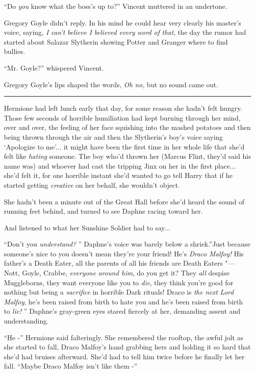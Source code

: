 ``Do \emph{you} know what the boss's up to?'' Vincent muttered in an
undertone.

Gregory Goyle didn't reply. In his mind he could hear very clearly his
master's voice, saying, \emph{I can't believe I believed every word of
that}, the day the rumor had started about Salazar Slytherin showing
Potter and Granger where to find bullies.

``Mr. Goyle?'' whispered Vincent.

Gregory Goyle's lips shaped the words, \emph{Oh no,} but no sound came
out.

\begin{center}\rule{3in}{0.4pt}\end{center}

Hermione had left lunch early that day, for some reason she hadn't felt
hungry. Those few seconds of horrible humiliation had kept burning
through her mind, over and over, the feeling of her face squishing into
the mashed potatoes and then being thrown through the air and then the
Slytherin's boy's voice saying `Apologize to me'... it might have
been the first time in her whole life that she'd felt like \emph{hating}
someone. The boy who'd thrown her (Marcus Flint, they'd said his name
was) and whoever had cast the tripping Jinx on her in the first
place... she'd felt it, for one horrible instant she'd wanted to go
tell Harry that if he started getting \emph{creative} on her behalf, she
wouldn't object.

She hadn't been a minute out of the Great Hall before she'd heard the
sound of running feet behind, and turned to see Daphne racing toward
her.

And listened to what her Sunshine Soldier had to say...

``Don't you \emph{understand?} '' Daphne's voice was barely below a
shriek.''Just because someone's nice to you doesn't mean they're your
friend! He's \emph{Draco Malfoy!} His father's a Death Eater, all the
parents of all his friends are Death Eaters "--- Nott, Goyle, Crabbe,
\emph{everyone around him}, do you get it? They \emph{all} despise
Muggleborns, they want everyone like you to \emph{die}, they think
you're good for nothing but being a \emph{sacrifice} in horrible Dark
rituals! Draco is \emph{the next Lord Malfoy}, he's been raised from
birth to hate you and he's been raised from birth to \emph{lie!} ''
Daphne's gray-green eyes stared fiercely at her, demanding assent and
understanding.

``He -'' Hermione said falteringly. She remembered the rooftop, the
awful jolt as she started to fall, Draco Malfoy's hand grabbing hers and
holding it so hard that she'd had bruises afterward. She'd had to tell
him twice before he finally let her fall. ``Maybe Draco Malfoy isn't
like them -''

